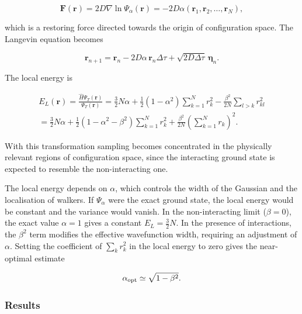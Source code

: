 \documentclass[11pt,a4paper,twoside,pdf]{article}
\numberwithin{equation}{section}
\begin{document}
\begin{equation}
\mathbf F(\mathbf r)
=
2D \nabla \ln \Psi_\alpha(\mathbf r)
=
-2D\alpha
\left(
\mathbf r_1,\mathbf r_2,\ldots,\mathbf r_N
\right),
\end{equation}

which is a restoring force directed towards the origin of configuration space.
The Langevin equation becomes

\begin{equation}
\mathbf r_{n+1}
=
\mathbf r_n
-
2D\alpha\,\mathbf r_n \Delta\tau
+
\sqrt{2D\Delta\tau}\,\boldsymbol\eta_n.
\end{equation}

The local energy is

\begin{equation}
\begin{split}
E_L(\mathbf r) = \frac{\hat H \Psi_T(\mathbf r)}{\Psi_T(\mathbf r)} = \frac{3}{2}N\alpha + \frac12(1-\alpha^2)\sum_{k=1}^N r_k^2 - \frac{\beta^2}{2N}\sum_{l>k} r_{kl}^2 \\
= \frac{3}{2}N\alpha + \frac12(1-\alpha^2 - \beta^2)\sum_{k=1}^N r_k^2 + \frac{\beta^2}{2N} \left( \sum_{k=1}^N r_{k} \right)^2.
\end{split}
\end{equation}

With this transformation sampling becomes concentrated in the physically relevant
regions of configuration space, since the interacting ground state is expected to
resemble the non-interacting one.

The local energy depends on $\alpha$, which controls the width of the Gaussian
and the localisation of walkers. If $\Psi_\alpha$ were the exact ground state, the
local energy would be constant and the variance would vanish. In the
non-interacting limit ($\beta=0$), the exact value $\alpha=1$ gives a constant
$E_L=\frac{3}{2}N$. In the presence of interactions, the $\beta^2$ term modifies
the effective wavefunction width, requiring an adjustment of $\alpha$. Setting the
coefficient of $\sum_k r_k^2$ in the local energy to zero gives the near-optimal
estimate

\begin{equation}
\alpha_{\rm opt} \simeq \sqrt{1-\beta^2}.
\end{equation}


\newpage
\subsubsection{Results}
\end{document}
